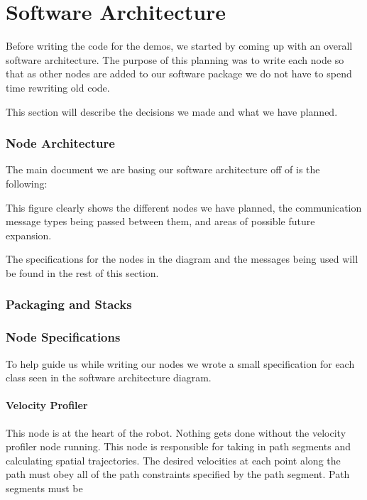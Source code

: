 \part{Software Architecture}

Before writing the code for the demos, we started by coming up with an
overall software architecture.  The purpose of this planning was to
write each node so that as other nodes are added to our software
package we do not have to spend time rewriting old code.

This section will describe the decisions we made and what we have
planned.

\section{Node Architecture}

The main document we are basing our software architecture off of is
the following:


This figure clearly shows the different nodes we have planned, the
communication message types being passed between them, and areas of
possible future expansion.

The specifications for the nodes in the diagram and the messages being
used will be found in the rest of this section.

\section{Packaging and Stacks}

\section{Node Specifications}

To help guide us while writing our nodes we wrote a small
specification for each class seen in the software architecture diagram.

\subsection{Velocity Profiler}
This node is at the heart of the robot.  Nothing gets done without the
velocity profiler node running.  This node is responsible for taking
in path segments and calculating spatial trajectories.  The desired
velocities at each point along the path must obey all of the path
constraints specified by the path segment.  Path segments must be

